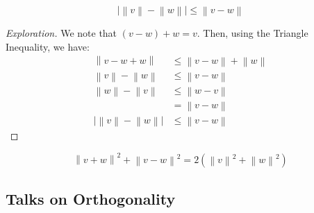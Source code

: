 \documentclass[openany]{book}
\newcommand{\norm}[1]{\left\lVert{#1}\right\rVert}
\begin{document}
\begin{cor}
	\begin{equation*}
		\lvert \norm{v} - \norm{w} \rvert \leq \norm{v - w}
	\end{equation*}
\end{cor}
\begin{proof}[Exploration]
	We note that $(v-w) + w = v$. Then, using the Triangle Inequality, we have:
	\begin{align*}
		\norm{v - w + w} &\leq \norm{v - w} + \norm{w} \\
		\norm{v} - \norm{w} &\leq \norm{v - w} \\
		\norm{w} - \norm{v} &\leq \norm{w - v} \\
		&= \norm{v - w} \\
		\lvert \norm{v} - \norm{w} \rvert &\leq \norm{v - w}
	\end{align*}
\end{proof}

\begin{cor}[Parallelogram]
	\begin{equation*}
		\norm{v + w}^{2} + \norm{v - w}^{2} = 2 \left( \norm{v}^{2} + \norm{w}^{2} \right)
	\end{equation*}
\end{cor}

\subsection{Talks on Orthogonality}
\end{document}
